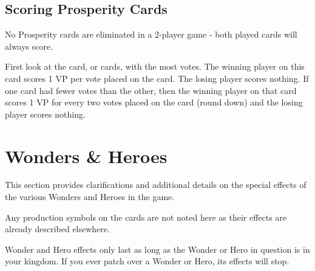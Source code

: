 \documentclass[10pt,twocolumn]{article}
\begin{document}
\begin{appendices}
\subsection{Scoring Prosperity Cards}
No Prosperity cards are eliminated in a 2-player game - both played cards will always score.

First look at the card, or cards, with the most votes. The winning player on this card scores 1 VP per vote placed on the card. The losing player scores nothing. If one card had fewer votes than the other, then the winning player on that card scores 1 VP for every two votes placed on the card (round down) and the losing player scores nothing.
\section{Wonders \& Heroes}
This section provides clarifications and additional details on the special effects of the various Wonders and Heroes in the game.

Any production symbols on the cards are not noted here as their effects are already described elsewhere.

Wonder and Hero effects only last as long as the Wonder or Hero in question is in your kingdom. If you ever patch over a Wonder or Hero, its effects will stop.

\end{appendices}
\end{document}
